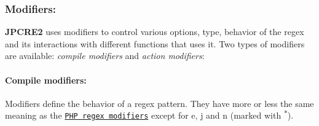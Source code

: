  \subsubsection*{Modifiers\+:}

{\bfseries J\+P\+C\+R\+E2} uses modifiers to control various options, type, behavior of the regex and its\textquotesingle{} interactions with different functions that uses it. Two types of modifiers are available\+: {\itshape compile modifiers} and {\itshape action modifiers}\+:

 \paragraph*{Compile modifiers\+:}

Modifiers define the behavior of a regex pattern. They have more or less the same meaning as the \href{https://php.net/manual/en/reference.pcre.pattern.modifiers.php}{\tt P\+HP regex modifiers} except for {\ttfamily e, j and n} (marked with \textsuperscript{$\ast$}).


